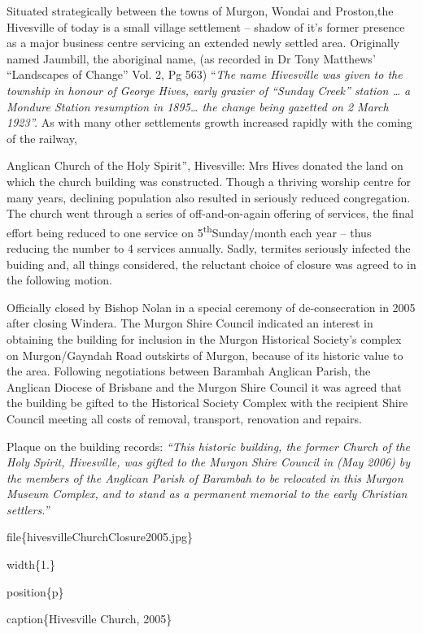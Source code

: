 Situated strategically between the towns of Murgon, Wondai and Proston,the Hivesville of today is a small village settlement -- shadow of it's former presence as a major business centre servicing an extended newly settled area. Originally named Jaumbill, the aboriginal name, (as recorded in Dr Tony Matthews' ``Landscapes of Change'' Vol. 2, Pg 563) ``\emph{The name Hivesville was given to the township in honour of George Hives, early grazier of ``Sunday Creek'' station \ldots{} a Mondure Station resumption in 1895\ldots{} the change being gazetted on 2 March 1923''.} As with many other settlements growth increased rapidly with the coming of the railway,

Anglican Church of the Holy Spirit'', Hivesville: Mrs Hives donated the land on which the church building was constructed. Though a thriving worship centre for many years, declining population also resulted in seriously reduced congregation. The church went through a series of off-and-on-again offering of services, the final effort being reduced to one service on 5\textsuperscript{th}Sunday/month each year -- thus reducing the number to 4 services annually. Sadly, termites seriously infected the buiding and, all things considered, the reluctant choice of closure was agreed to in the following motion.

Officially closed by Bishop Nolan in a special ceremony of de-consecration in 2005 after closing Windera. The Murgon Shire Council indicated an interest in obtaining the building for inclusion in the Murgon Historical Society's complex on Murgon/Gayndah Road outskirts of Murgon, because of its historic value to the area. Following negotiations between Barambah Anglican Parish, the Anglican Diocese of Brisbane and the Murgon Shire Council it was agreed that the building be gifted to the Historical Society Complex with the recipient Shire Council meeting all costs of removal, transport, renovation and repairs.

Plaque on the building records: \emph{``This historic building, the former Church of the Holy Spirit, Hivesville, was gifted to the Murgon Shire Council in (May 2006) by the members of the Anglican Parish of Barambah to be relocated in this Murgon Museum Complex, and to stand as a permanent memorial to the early Christian settlers.''}

file\{hivesvilleChurchClosure2005.jpg\}

width\{1.\}

position\{p\}

caption\{Hivesville Church, 2005\}

